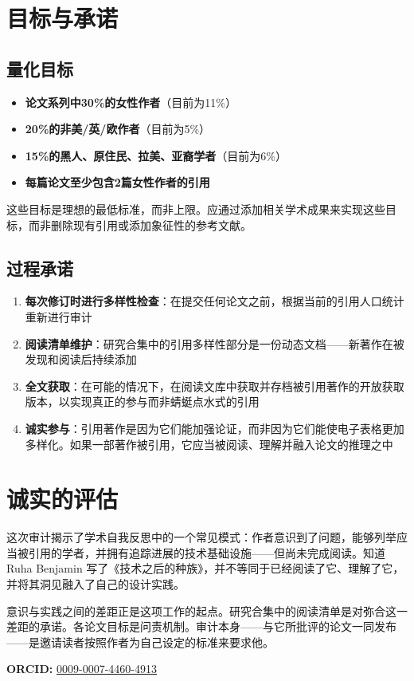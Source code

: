 \documentclass[10pt,letterpaper,twocolumn]{article}
\begin{document}

\section{目标与承诺}

\subsection{量化目标}

\begin{itemize}
  \item \textbf{论文系列中30\%的女性作者}（目前为11\%）
  \item \textbf{20\%的非美/英/欧作者}（目前为5\%）
  \item \textbf{15\%的黑人、原住民、拉美、亚裔学者}（目前为6\%）
  \item \textbf{每篇论文至少包含2篇女性作者的引用}
\end{itemize}

这些目标是理想的最低标准，而非上限。应通过添加相关学术成果来实现这些目标，而非删除现有引用或添加象征性的参考文献。

\subsection{过程承诺}

\begin{enumerate}
  \item \textbf{每次修订时进行多样性检查}：在提交任何论文之前，根据当前的引用人口统计重新进行审计
  \item \textbf{阅读清单维护}：研究合集中的引用多样性部分是一份动态文档——新著作在被发现和阅读后持续添加
  \item \textbf{全文获取}：在可能的情况下，在阅读文库中获取并存档被引用著作的开放获取版本，以实现真正的参与而非蜻蜓点水式的引用
  \item \textbf{诚实参与}：引用著作是因为它们能加强论证，而非因为它们能使电子表格更加多样化。如果一部著作被引用，它应当被阅读、理解并融入论文的推理之中
\end{enumerate}


\section{诚实的评估}

这次审计揭示了学术自我反思中的一个常见模式：作者意识到了问题，能够列举应当被引用的学者，并拥有追踪进展的技术基础设施——但尚未完成阅读。知道 Ruha Benjamin 写了《技术之后的种族》，并不等同于已经阅读了它、理解了它，并将其洞见融入了自己的设计实践。

意识与实践之间的差距正是这项工作的起点。研究合集中的阅读清单是对弥合这一差距的承诺。各论文目标是问责机制。审计本身——与它所批评的论文一同发布——是邀请读者按照作者为自己设定的标准来要求他。

\vspace{0.5em}
\noindent\textbf{ORCID:} \href{https://orcid.org/0009-0007-4460-4913}{0009-0007-4460-4913}




\end{document}
